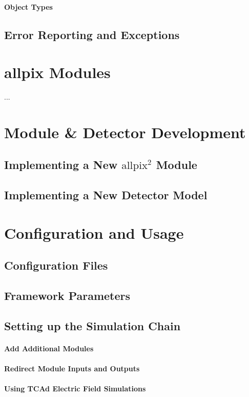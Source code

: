 \documentclass{scrartcl}
\newcommand{\apsq}{\texorpdfstring{\ensuremath{\mathrm{allpix}^2}}{allpix\textasciicircum 2}\xspace}
\begin{document}
\paragraph{Object Types}
\subsection{Error Reporting and Exceptions}

\section{allpix Modules}
...

\section{Module & Detector Development}
\subsection{Implementing a New \apsq Module}
\subsection{Implementing a New Detector Model}

\section{Configuration and Usage}
\subsection{Configuration Files}
\subsection{Framework Parameters}
\subsection{Setting up the Simulation Chain}
\paragraph{Add Additional Modules}
\paragraph{Redirect Module Inputs and Outputs}
\paragraph{Using TCAd Electric Field Simulations}
\end{document}
